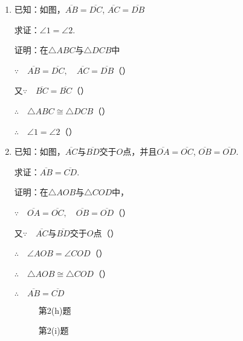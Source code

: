\begin{enumerate}
\begin{enumerate}
\item 已知：如图，$\overline{AB}=\overline{DC}$, $\overline{AC}=\overline{DB}$

求证：$\angle 1=\angle 2$.

证明：在$\triangle ABC$与$\triangle DCB$中

$\because\quad \overline{AB}=\overline{DC},\quad \overline{AC}=\overline{DB}$（\qquad ）

又$\because\quad \overline{BC}=\overline{BC}$（\qquad）

$\therefore\quad \triangle ABC\cong \triangle DCB$（\qquad）

$\therefore\quad \angle 1=\angle 2$（\qquad ）

\item 已知：如图，$\overline{AC}$与$\overline{BD}$交于$O$点，并且$\overline{OA}=\overline{OC}$, $\overline{OB}=\overline{OD}$.

求证：$\overline{AB}=\overline{CD}$.

证明：在$\triangle AOB$与$\triangle COD$中，

$\because\quad \overline{OA}=\overline{OC},\quad \overline{OB}=\overline{OD}$（\qquad）

又$\because\quad \overline{AC}$与$\overline{BD}$交于$O$点（\qquad）

$\therefore\quad \angle AOB=\angle COD$（\qquad）

$\therefore\quad \triangle AOB\cong\triangle COD$（\qquad）

$\therefore\quad \overline{AB}=\overline{CD}$

\begin{figure}[htp]\centering
    \begin{minipage}[t]{0.48\textwidth}
    \centering
{}
    \caption*{第2(h)题}
    \end{minipage}
    \begin{minipage}[t]{0.48\textwidth}
    \centering
    \caption*{第2(i)题}
    \end{minipage}
    \end{figure}


\end{enumerate}
\end{enumerate}
